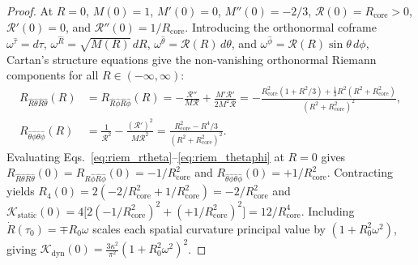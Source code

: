 \documentclass[pdflatex,sn-mathphys-num]{sn-jnl}
\theoremstyle{thmstyleone}
\theoremstyle{thmstyletwo}
\theoremstyle{thmstylethree}
\begin{document}
\begin{proof}
At $R=0$, $M(0) = 1$, $M'(0) = 0$, $M''(0) = -2/3$, $\mathcal{R}(0) = R_{\mathrm{core}} > 0$, $\mathcal{R}'(0) = 0$, and $\mathcal{R}''(0) = 1/R_{\mathrm{core}}$. Introducing the orthonormal coframe $\omega^{\hat{\tau}} = d\tau$, $\omega^{\hat{R}} = \sqrt{M(R)}\,dR$, $\omega^{\hat{\theta}} = \mathcal{R}(R)\,d\theta$, and $\omega^{\hat{\phi}} = \mathcal{R}(R)\sin\theta\,d\phi$, Cartan's structure equations give the non-vanishing orthonormal Riemann components for all $R \in (-\infty,\infty)$:
\begin{align}
R_{\hat{R}\hat{\theta}\hat{R}\hat{\theta}}(R) &= R_{\hat{R}\hat{\phi}\hat{R}\hat{\phi}}(R) = -\frac{\mathcal{R}''}{M\mathcal{R}} + \frac{M'\mathcal{R}'}{2M^2\mathcal{R}} = -\frac{R_{\mathrm{core}}^2(1 + R^2/3) + \frac{1}{3}R^2(R^2 + R_{\mathrm{core}}^2)}{(R^2 + R_{\mathrm{core}}^2)^2}, \label{eq:riem_rtheta}\\
R_{\hat{\theta}\hat{\phi}\hat{\theta}\hat{\phi}}(R) &= \frac{1}{\mathcal{R}^2} - \frac{(\mathcal{R}')^2}{M\mathcal{R}^2} = \frac{R_{\mathrm{core}}^2 - R^4/3}{(R^2 + R_{\mathrm{core}}^2)^2}. \label{eq:riem_thetaphi}
\end{align}
Evaluating Eqs.~\eqref{eq:riem_rtheta}--\eqref{eq:riem_thetaphi} at $R=0$ gives $R_{\hat{R}\hat{\theta}\hat{R}\hat{\theta}}(0) = R_{\hat{R}\hat{\phi}\hat{R}\hat{\phi}}(0) = -1/R_{\mathrm{core}}^2$ and $R_{\hat{\theta}\hat{\phi}\hat{\theta}\hat{\phi}}(0) = +1/R_{\mathrm{core}}^2$. Contracting yields $R_4(0) = 2(-2/R_{\mathrm{core}}^2 + 1/R_{\mathrm{core}}^2) = -2/R_{\mathrm{core}}^2$ and $\mathcal{K}_{\mathrm{static}}(0) = 4\big[2(-1/R_{\mathrm{core}}^2)^2 + (+1/R_{\mathrm{core}}^2)^2\big] = 12/R_{\mathrm{core}}^4$. Including $\dot{R}(\tau_0) = \mp R_0\omega$ scales each spatial curvature principal value by $(1 + R_0^2\omega^2)$, giving $\mathcal{K}_{\mathrm{dyn}}(0) = \frac{3\kappa^2}{\pi^2}(1 + R_0^2\omega^2)^2$.
\end{proof}
\end{document}
